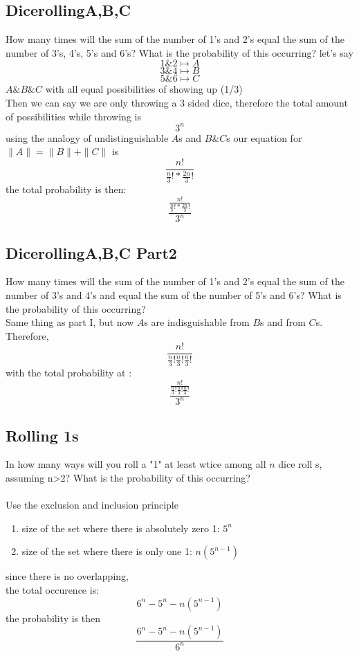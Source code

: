 \documentclass[a4paper,12pt]{article}
\begin{document}
\subsection{DicerollingA,B,C}
How many times will the sum of the number of 1's and 2's equal the
sum of the number of 3's, 4's, 5's and 6's?  What is the probability
of this occurring?
let's say\\
\[ 1 \& 2 \mapsto A\]
\[ 3 \& 4 \mapsto B\]
\[ 5 \& 6 \mapsto C\]
$A \& B \& C$ with all equal possibilities of showing up (1/3)\\
Then we can say we are only throwing a 3 sided dice, therefore the total amount of possibilities while throwing is\\
\[3^n\]
using the analogy of undistinguishable $A$s and $ B\& C$s
our equation for $ \|A\|= \|B\|+\|C\|$
is \\
  \[ \frac{n!}{\frac{n}{3}! * \frac{2n}{3}!}\]
the total probability is then:\\
  \[ \frac {\frac{n!}{\frac{n}{3}! * \frac{2n}{3}!}} {3^{n}}\]
\subsection{DicerollingA,B,C Part2}
How many times will the sum of the number of 1's and 2's equal the
sum of the number of 3's and 4's and equal the sum of the number of
5's and 6's?  What is the probability of this occurring?\\
Same thing as part I, but now $A$s are indisguishable from $B$s and from $C$s. Therefore,
  \[\frac{n!}{\frac{n}{3}!\frac{n}{3}!\frac{n}{3}!}\]
  with the total probability at :\\
  \[ \frac {\frac{n!}{\frac{n}{3}!\frac{n}{3}!\frac{n}{3}!}} {3^{n}}\]
\subsection{Rolling 1s}
In how many ways will you roll a "1" at least wtice among all $n$ dice roll s, assuming n>2? What is the probability of this occurring?\\
\bigskip\\
Use the exclusion and inclusion principle
\begin{enumerate}
  \item{size of the set where there is absolutely zero 1: $5^n$}
  \item{size of the set where there is only one 1: $n(5^{n-1})$}
\end{enumerate}
since there is no overlapping,\\
the total occurence is:
\[6^n - 5^n - n(5^{n-1})\]
the probability is then 
\[\frac{6^n - 5^n - n(5^{n-1})}{6^n}\]
\end{document}
